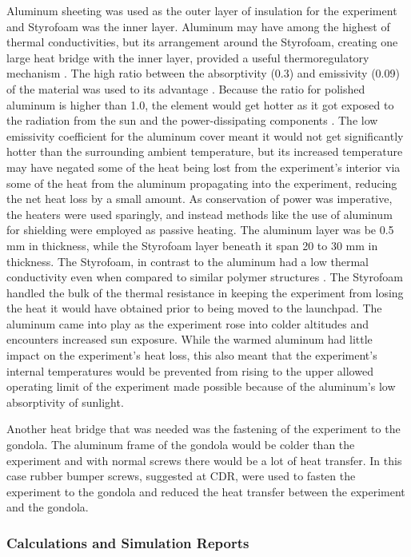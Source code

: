 Aluminum sheeting was used as the outer layer of insulation for the experiment and Styrofoam was the inner layer. Aluminum may have among the highest of thermal conductivities, but its arrangement around the Styrofoam, creating one large heat bridge with the inner layer, provided a useful thermoregulatory mechanism \cite{EngTool}. The high ratio between the absorptivity (0.3) and emissivity (0.09) of the material was used to its advantage \cite{EngTool}. Because the ratio for polished aluminum is higher than 1.0, the element would get hotter as it got exposed to the radiation from the sun and the power-dissipating components \cite{RedRok}. The low emissivity coefficient for the aluminum cover meant it would not get significantly hotter than the surrounding ambient temperature, but its increased temperature may have negated some of the heat being lost from the experiment's interior via some of the heat from the aluminum propagating into the experiment, reducing the net heat loss by a small amount. As conservation of power was imperative, the heaters were used sparingly, and instead methods like the use of aluminum for shielding were employed as passive heating. The aluminum layer was be 0.5 mm in thickness, while the Styrofoam layer beneath it span 20 to 30 mm in thickness. The Styrofoam, in contrast to the aluminum had a low thermal conductivity even when compared to similar polymer structures \cite{EngTool}. The Styrofoam handled the bulk of the thermal resistance in keeping the experiment from losing the heat it would have obtained prior to being moved to the launchpad. The aluminum came into play as the experiment rose into colder altitudes and encounters increased sun exposure. While the warmed aluminum had little impact on the experiment's heat loss, this also meant that the experiment's internal temperatures would be prevented from rising to the upper allowed operating limit of the experiment made possible because of the aluminum's low absorptivity of sunlight.

Another heat bridge that was needed was the fastening of the experiment to the gondola. The aluminum frame of the gondola would be colder than the experiment and with normal screws there would be a lot of heat transfer. In this case rubber bumper screws, suggested at CDR, were used to fasten the experiment to the gondola and reduced the heat transfer between the experiment and the gondola.


\subsubsection{Calculations and Simulation Reports}
\label{sec:4.6.5}

